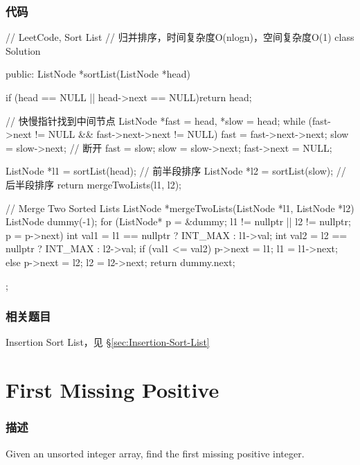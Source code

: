 \subsubsection{代码}
\begin{Code}
// LeetCode, Sort List
// 归并排序，时间复杂度O(nlogn)，空间复杂度O(1)
class Solution {
public:
    ListNode *sortList(ListNode *head) {
        if (head == NULL || head->next == NULL)return head;

        // 快慢指针找到中间节点
        ListNode *fast = head, *slow = head;
        while (fast->next != NULL && fast->next->next != NULL) {
            fast = fast->next->next;
            slow = slow->next;
        }
        // 断开
        fast = slow;
        slow = slow->next;
        fast->next = NULL;

        ListNode *l1 = sortList(head);  // 前半段排序
        ListNode *l2 = sortList(slow);  // 后半段排序
        return mergeTwoLists(l1, l2);
    }

    // Merge Two Sorted Lists
    ListNode *mergeTwoLists(ListNode *l1, ListNode *l2) {
        ListNode dummy(-1);
        for (ListNode* p = &dummy; l1 != nullptr || l2 != nullptr; p = p->next) {
            int val1 = l1 == nullptr ? INT_MAX : l1->val;
            int val2 = l2 == nullptr ? INT_MAX : l2->val;
            if (val1 <= val2) {
                p->next = l1;
                l1 = l1->next;
            } else {
                p->next = l2;
                l2 = l2->next;
            }
        }
        return dummy.next;
    }
};
\end{Code}


\subsubsection{相关题目}
\begindot
\item Insertion Sort List，见 \S \ref{sec:Insertion-Sort-List}
\myenddot


\section{First Missing Positive} %
\label{sec:first-missing-positive}


\subsubsection{描述}
Given an unsorted integer array, find the first missing positive integer.


